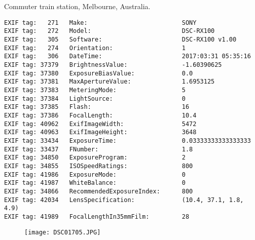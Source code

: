 \section{\protect{}}
\noindent Commuter train station, Melbourne, Australia.
\noindent
\begin{lstlisting}
EXIF tag:   271   Make:                          SONY
EXIF tag:   272   Model:                         DSC-RX100
EXIF tag:   305   Software:                      DSC-RX100 v1.00
EXIF tag:   274   Orientation:                   1
EXIF tag:   306   DateTime:                      2017:03:31 05:35:16
EXIF tag: 37379   BrightnessValue:               -1.60390625
EXIF tag: 37380   ExposureBiasValue:             0.0
EXIF tag: 37381   MaxApertureValue:              1.6953125
EXIF tag: 37383   MeteringMode:                  5
EXIF tag: 37384   LightSource:                   0
EXIF tag: 37385   Flash:                         16
EXIF tag: 37386   FocalLength:                   10.4
EXIF tag: 40962   ExifImageWidth:                5472
EXIF tag: 40963   ExifImageHeight:               3648
EXIF tag: 33434   ExposureTime:                  0.03333333333333333
EXIF tag: 33437   FNumber:                       1.8
EXIF tag: 34850   ExposureProgram:               2
EXIF tag: 34855   ISOSpeedRatings:               800
EXIF tag: 41986   ExposureMode:                  0
EXIF tag: 41987   WhiteBalance:                  0
EXIF tag: 34866   RecommendedExposureIndex:      800
EXIF tag: 42034   LensSpecification:             (10.4, 37.1, 1.8, 4.9)
EXIF tag: 41989   FocalLengthIn35mmFilm:         28

\end{lstlisting}
\clearpage
\begin{figure}
\raggedleft
\texttt{[image: DSC01705.JPG]}
\end{figure}


\clearpage
